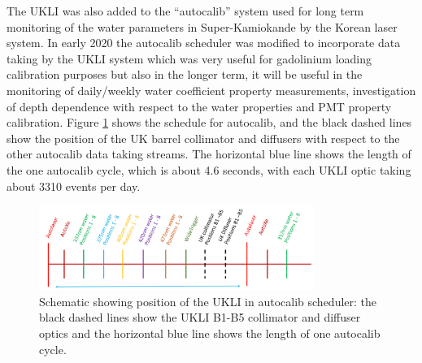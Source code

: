 \begin{figure}
    
\end{figure}

The UKLI was also added to the ``autocalib'' system used for long term monitoring of the water parameters in Super-Kamiokande by the Korean laser system. In early 2020 the autocalib scheduler was modified to incorporate data taking by the UKLI system which was very useful for gadolinium loading calibration purposes but also in the longer term, it will be useful in the monitoring of daily/weekly water coefficient property measurements, investigation of depth dependence with respect to the water properties and PMT property calibration. Figure \ref{fig:autocalib} shows the schedule for autocalib, and the black dashed lines show the position of the UK barrel collimator and diffusers with respect to the other autocalib data taking streams. The horizontal blue line shows the length of the one autocalib cycle, which is about 4.6 seconds, with each UKLI optic taking about 3310 events per day. 

\begin{figure}
    \centering
    \includegraphics[width=0.8\textwidth]{Figures/autocalib.png}
    \caption{Schematic showing position of the UKLI in autocalib scheduler: the black dashed lines show the UKLI B1-B5 collimator and diffuser optics and the horizontal blue line shows the length of one autocalib cycle.}
    \label{fig:autocalib}
\end{figure}

